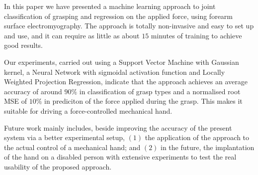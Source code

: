 In this paper we have presented a machine learning approach to
joint classification of grasping and regression on the applied force,
using forearm surface electromyography. The approach is totally
non-invasive and easy to set up and use, and it can require as little
as about $15$ minutes of training to achieve good results.

Our experiments, carried out using a Support Vector Machine with
Gaussian kernel, a Neural Network with sigmoidal activation function
and Locally Weighted Projection Regression, indicate that the approach
achieves an average accuracy of around $90\%$ in classification of
grasp types and a normalised root MSE of $10\%$ in prediciton of the
force applied during the grasp. This makes it suitable for driving a
force-controlled mechanical hand.

Future work mainly includes, beside improving the accuracy of the present
system via a better experimental setup, $(1)$ the application of the
approach to the actual control of a mechanical hand; and $(2)$ in the
future, the implantation of the hand on a disabled person with
extensive experiments to test the real usability of the proposed
approach.
